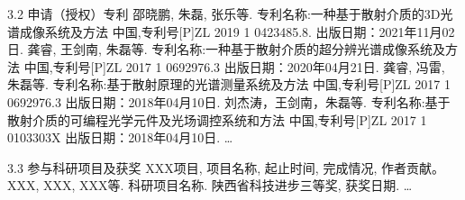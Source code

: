 \begin{resume}
\begin{resumelist}{\hspace{-0.25em}3.2\hspace{0.5em} 申请（授权）专利}
\resumelistitem 邵晓鹏, 朱磊, 张乐等. 专利名称:一种基于散射介质的3D光谱成像系统及方法 中国,专利号[P]ZL 2019 1 0423485.8. 出版日期：2021年11月02日.
\resumelistitem 龚睿, 王剑南, 朱磊等. 专利名称:一种基于散射介质的超分辨光谱成像系统及方法 中国,专利号[P]ZL 2017 1 0692976.3 出版日期：2020年04月21日.
\resumelistitem 龚睿, 冯雷, 朱磊等. 专利名称:基于散射原理的光谱测量系统及方法 中国,专利号[P]ZL 2017 1 0692976.3 出版日期：2018年04月10日.
\resumelistitem 刘杰涛，王剑南，朱磊等. 专利名称:基于散射介质的可编程光学元件及光场调控系统和方法 中国,专利号[P]ZL 2017 1 0103303X 出版日期：2018年04月10日.
\resumelistitem \ldots
\end{resumelist}

\begin{resumelist}{\hspace{-0.25em}3.3\hspace{0.5em} 参与科研项目及获奖}
\resumelistitem XXX项目, 项目名称, 起止时间, 完成情况, 作者贡献。
\resumelistitem XXX, XXX, XXX等. 科研项目名称. 陕西省科技进步三等奖, 获奖日期.
\resumelistitem \ldots
\end{resumelist}
\end{resume}
